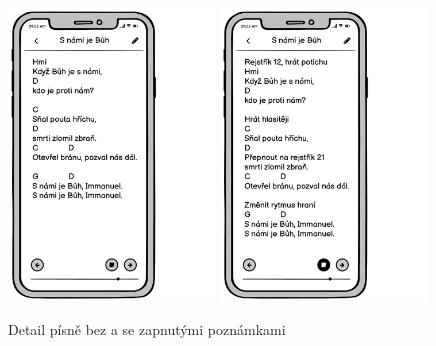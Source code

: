\begin{figure}
    \includegraphics[width=0.49\textwidth]{images/B-navrh-ui/B-3-detail-pisne.pdf}
    \includegraphics[width=0.49\textwidth]{images/B-navrh-ui/B-3-detail-pisne-poznamky.pdf}
    \caption{Detail písně bez a se zapnutými poznámkami}
\end{figure}


